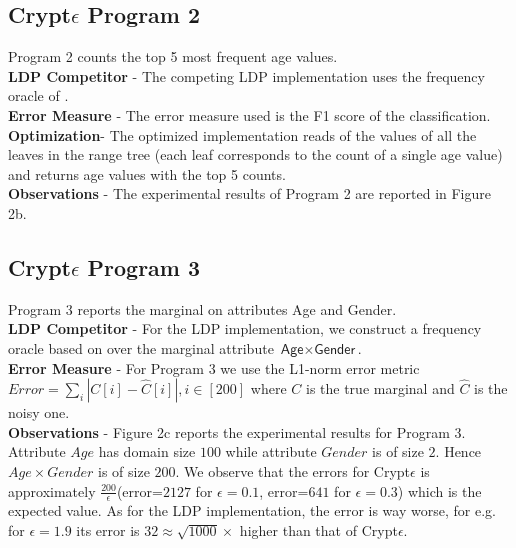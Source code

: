 \subsection*{Crypt$\epsilon$ Program 2}
Program 2 counts the top 5 most frequent age values.
\\\textbf{\textsf{LDP} Competitor} - The competing \textsf{LDP} implementation uses the frequency oracle of \cite{LDP1}. 
\\\textbf{Error Measure} - The error measure used is the F1 score of the classification.  \\
\textbf{Optimization}- The optimized implementation reads of the values of all the leaves in  the range tree (each leaf corresponds to the count of a single age value) and returns age values with the top 5 counts.
\\\textbf{Observations} - The experimental results of  Program  2 are reported in  Figure 2b. 

\subsection*{Crypt$\epsilon$ Program 3}
Program 3 reports the marginal on attributes \textsf{Age} and \textsf{Gender}.  
\\\textbf{\textsf{LDP} Competitor} - For the  \textsf{LDP} implementation, we construct a frequency oracle based on \cite{LDP1} over the marginal attribute $\textsf{Age}\times\textsf{Gender}$. 
\\\textbf{Error Measure} - For Program 3 we use the L1-norm error metric $ Error=\sum_{i}|C[i]-\hat{C}[i]|, i \in [200]$ where $C$ is the true marginal and $\hat{C}$ is the noisy one. 
\\\textbf{Observations} - Figure 2c reports the experimental results for Program 3. Attribute $Age$ has domain size $100$ while attribute $Gender$ is of size $2$. Hence $Age\times Gender$ is of size $200$. We observe that the errors for Crypt$\epsilon$ is approximately $\frac{200}{\epsilon}$(error=$2127$ for $\epsilon=0.1$, error=$641$ for $\epsilon=0.3$) which is the expected value. As for the \textsf{LDP} implementation, the error is way worse, for e.g. for $\epsilon=1.9$ its error is $32 \approx \sqrt{1000} \times$ higher than that of Crypt$\epsilon$.


